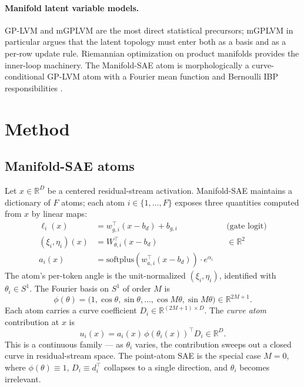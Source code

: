 \documentclass[10pt,twocolumn]{article}
\begin{document}
\paragraph{Manifold latent variable models.} GP-LVM \cite{lawrence2004gplvm}
and mGPLVM \cite{jensen2020mgplvm} are the most direct statistical precursors;
mGPLVM in particular argues that the latent topology must enter both as a basis
and as a per-row update rule. Riemannian optimization on product manifolds
\cite{boumal2020manopt} provides the inner-loop machinery. The Manifold-SAE atom
is morphologically a curve-conditional GP-LVM atom with a Fourier mean function
and Bernoulli IBP responsibilities \cite{griffiths2011ibp}.

\section{Method}
\label{sec:method}

\subsection{Manifold-SAE atoms}

Let $x \in \mathbb{R}^{D}$ be a centered residual-stream activation. Manifold-SAE
maintains a dictionary of $F$ atoms; each atom $i \in \{1,\dots,F\}$ exposes
three quantities computed from $x$ by linear maps:
\begin{align}
\ell_i(x) &= w_{g,i}^\top (x{-}b_d) + b_{g,i} && \text{(gate logit)}\\
(\xi_i, \eta_i)(x) &= W_{\theta,i}^\top (x{-}b_d) && \in \mathbb{R}^2 \\
a_i(x) &= \mathrm{softplus}(w_{a,i}^\top (x{-}b_d)) \cdot e^{\alpha_i}
\end{align}
The atom's per-token angle is the unit-normalized $(\xi_i,\eta_i)$, identified
with $\theta_i \in S^1$. The Fourier basis on $S^1$ of order $M$ is
\[
\phi(\theta) = \bigl(1,\cos\theta,\sin\theta,\dots,\cos M\theta,\sin M\theta\bigr)
\in \mathbb{R}^{2M{+}1}.
\]
Each atom carries a curve coefficient $D_i \in \mathbb{R}^{(2M{+}1)\times D}$. The
\emph{curve atom} contribution at $x$ is
\[
u_i(x) = a_i(x)\, \phi(\theta_i(x))^\top D_i \in \mathbb{R}^D.
\]
This is a continuous family --- as $\theta_i$ varies, the contribution sweeps out
a closed curve in residual-stream space. The point-atom SAE is the special case
$M{=}0$, where $\phi(\theta)\equiv 1$, $D_i \equiv d_i^\top$ collapses to a single
direction, and $\theta_i$ becomes irrelevant.
\end{document}
